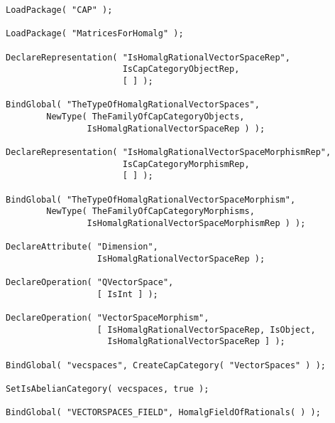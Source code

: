 \begin{small}
\begin{Verbatim}[commandchars=!@\%,frame=single]
LoadPackage( "CAP" );

LoadPackage( "MatricesForHomalg" );

DeclareRepresentation( "IsHomalgRationalVectorSpaceRep",
                       IsCapCategoryObjectRep,
                       [ ] );

BindGlobal( "TheTypeOfHomalgRationalVectorSpaces",
        NewType( TheFamilyOfCapCategoryObjects,
                IsHomalgRationalVectorSpaceRep ) );

DeclareRepresentation( "IsHomalgRationalVectorSpaceMorphismRep",
                       IsCapCategoryMorphismRep,
                       [ ] );

BindGlobal( "TheTypeOfHomalgRationalVectorSpaceMorphism",
        NewType( TheFamilyOfCapCategoryMorphisms,
                IsHomalgRationalVectorSpaceMorphismRep ) );

DeclareAttribute( "Dimension",
                  IsHomalgRationalVectorSpaceRep );

DeclareOperation( "QVectorSpace",
                  [ IsInt ] );

DeclareOperation( "VectorSpaceMorphism",
                  [ IsHomalgRationalVectorSpaceRep, IsObject,
                    IsHomalgRationalVectorSpaceRep ] );

BindGlobal( "vecspaces", CreateCapCategory( "VectorSpaces" ) );

SetIsAbelianCategory( vecspaces, true );

BindGlobal( "VECTORSPACES_FIELD", HomalgFieldOfRationals( ) );

\end{Verbatim}
\end{small}
